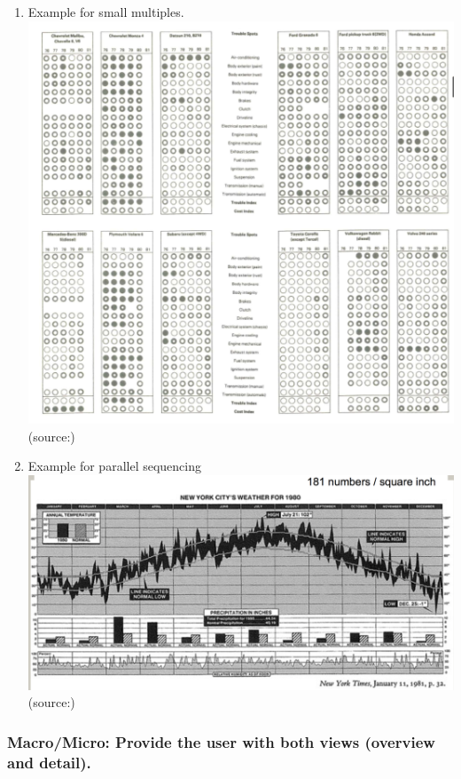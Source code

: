 \documentclass[]{book}
\theoremstyle{definition}
\theoremstyle{definition}
\theoremstyle{definition}
\theoremstyle{remark}
\begin{document}
\begin{enumerate}
\def\labelenumi{\arabic{enumi}.}
\item
  Example for small multiples.
  \includegraphics{images/Tufte_figure8.png} (source:\citep{Tufte_2001})
\item
  Example for parallel sequencing
  \includegraphics{images/Tufte_figure7.png} (source:\citep{Tufte_2001})
\end{enumerate}

\subsubsection{Macro/Micro: Provide the user with both views (overview
and
detail).}\label{macromicro-provide-the-user-with-both-views-overview-and-detail.}
\end{document}
